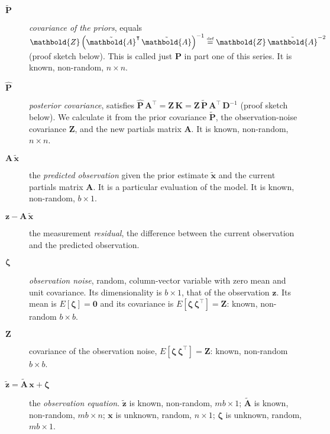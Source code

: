 \documentclass[10pt,oneside,x11names]{article}
\begin{document}
\begin{description}
\item[{\({\tilde{\mathbold{P}}}\)}] \emph{covariance of the priors}, equals
\(\mathbold{Z}\left(
     {\tilde{\mathbold{A}}}^\intercal\,
     {\tilde{\mathbold{A}}}
     \right)^{-1}\stackrel{\text{\tiny def}}{=}
     \mathbold{Z}\,{\tilde{\mathbold{A}}}^{-2}\)
(proof sketch
below). This is called just \(\mathbold{P}\) in part one of this series.
It is known, non-random, \(n\times{n}\).

\item[{\({\hat{\mathbold{P}}}\)}] \emph{posterior covariance}, satisfies
\({\hat{\mathbold{P}}}\,
     {\mathbold{A}}^\intercal=
     \mathbold{Z}\,\mathbold{K}=
     \mathbold{Z}\,{\tilde{\mathbold{P}}}\,\mathbold{A}^\intercal\,\mathbold{D}^{-1}\)
(proof sketch below). We calculate it from the prior covariance
\(\tilde{\mathbold{P}}\), the observation-noise covariance \(\mathbold{Z}\), and the new
partials matrix \(\mathbold{A}\). 
It is known, non-random, \(n\times{n}\).

\item[{\(\mathbold{A}\,{\tilde{\mathbold{x}}}\)}] the \emph{predicted observation} given
the prior estimate \({\tilde{\mathbold{x}}}\) and the current partials matrix
\(\mathbold{A}\). It is a particular evaluation of the model. It is known,
non-random, \(b\times{1}\).

\item[{\(\mathbold{z}-\mathbold{A}\,{\tilde{\mathbold{x}}}\)}] the measurement
\emph{residual}, the difference between the current observation and the
predicted observation.

\item[{\(\mathbold{\zeta}\)}] \emph{observation noise}, random, column-vector variable with
zero mean and unit covariance. Its dimensionality is \(b\times{1}\), that of
the observation \(\mathbold{z}\). Its
mean is
\(E
     \left[
     \mathbold{\zeta}
     \right]=
     \mathbold{0}\) and its covariance is
\(E
     \left[
     \mathbold{\zeta}\,
     \mathbold{\zeta}^\intercal
     \right]=
     \mathbold{Z}\): known, non-random \(b\times{b}\).

\item[{\(\mathbold{Z}\)}] covariance of the observation noise, \(E
     \left[
     \mathbold{\zeta}\,
     \mathbold{\zeta}^\intercal
     \right]=
     \mathbold{Z}\): known, non-random \(b\times{b}\).

\item[{\(\tilde{\mathbold{z}} = \tilde{\mathbold{A}}\,{\mathbold{x}} + \mathbold{\zeta}\)}] the
\emph{observation equation}.
\(\tilde{\mathbold{z}}\) is known, non-random, \(m b\times{1}\);
\(\tilde{\mathbold{A}}\) is known, non-random, \(m b\times{n}\); \({\mathbold{x}}\)
is unknown, random, \(n\times{1}\); \(\mathbold{\zeta}\) is unknown, random,
\(m b\times{1}\).


\end{description}
\end{document}
